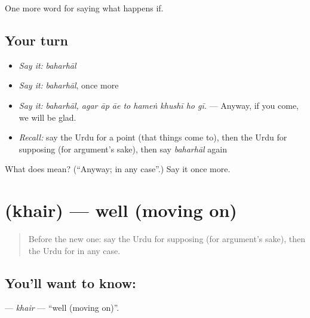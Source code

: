 \begin{grammarlens}[title={What you've built}]
One more word for saying what happens if.
\end{grammarlens}

\subsection*{Your turn}
\begin{itemize}
\raggedright
  \item \emph{Say it:} \emph{baharhāl}
  \item \emph{Say it:} \emph{baharhāl}, once more
  \item \emph{Say it:} \emph{baharhāl, agar āp āe to hameṅ khushī ho gī.} — Anyway, if you come, we will be glad.
  \item \emph{Recall:} say the Urdu for a point (that things come to), then the Urdu for supposing (for argument's sake), then say \emph{baharhāl} again
\end{itemize}

\begin{tcolorbox}[breakable,colback=teal!4,colframe=teal!35!black,title={Before you move on}]
What does  mean? (\textquotedblleft{}Anyway; in any case\textquotedblright{}.) Say it once more.
\end{tcolorbox}
\section[\texorpdfstring{\ur{خیر} (khair)}{خیر (khair)}]{ (khair) — well (moving on)}

\label{lesson:UR-C542-khair}



\begin{quote}
Before the new one: say the Urdu for supposing (for argument's sake), then the Urdu for in any case.
\end{quote}

\subsection*{You'll want to know: }
\textbf{} — \emph{khair} — \textquotedblleft{}well (moving on)\textquotedblright{}.

\begin{quote}
        
\end{quote}

